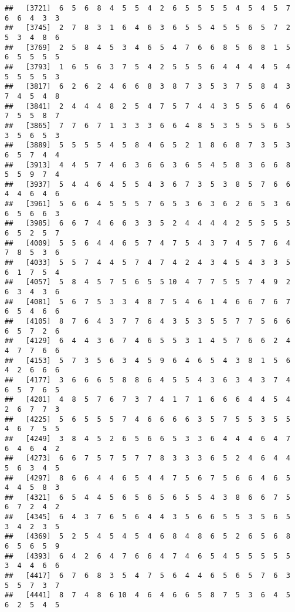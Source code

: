 \documentclass[
]{book}
\begin{document}
\begin{verbatim}
##   [3721]  6  5  6  8  4  5  5  4  2  6  5  5  5  5  4  5  4  5  7  6  6  4  3  3
##   [3745]  2  7  8  3  1  6  4  6  3  6  5  5  4  5  5  6  5  7  2  5  3  4  8  6
##   [3769]  2  5  8  4  5  3  4  6  5  4  7  6  6  8  5  6  8  1  5  6  5  5  5  5
##   [3793]  1  6  5  6  3  7  5  4  2  5  5  5  6  4  4  4  4  5  4  5  5  5  5  3
##   [3817]  6  2  6  2  4  6  6  8  3  8  7  3  5  3  7  5  8  4  3  7  4  5  4  8
##   [3841]  2  4  4  4  8  2  5  4  7  5  7  4  4  3  5  5  6  4  6  7  5  5  8  7
##   [3865]  7  7  6  7  1  3  3  3  6  6  4  8  5  3  5  5  5  6  5  3  5  6  5  3
##   [3889]  5  5  5  5  4  5  8  4  6  5  2  1  8  6  8  7  3  5  3  6  5  7  4  4
##   [3913]  4  4  5  7  4  6  3  6  6  3  6  5  4  5  8  3  6  6  8  5  5  9  7  4
##   [3937]  5  4  4  6  4  5  5  4  3  6  7  3  5  3  8  5  7  6  6  4  4  6  4  6
##   [3961]  5  6  6  4  5  5  5  7  6  5  3  6  3  6  2  6  5  3  6  6  5  6  6  3
##   [3985]  6  6  7  4  6  6  3  3  5  2  4  4  4  4  2  5  5  5  5  6  5  2  5  7
##   [4009]  5  5  6  4  4  6  5  7  4  7  5  4  3  7  4  5  7  6  4  7  8  5  3  6
##   [4033]  5  5  7  4  4  5  7  4  7  4  2  4  3  4  5  4  3  3  5  6  1  7  5  4
##   [4057]  5  8  4  5  7  5  6  5  5 10  4  7  7  5  5  7  4  9  2  6  3  4  3  6
##   [4081]  5  6  7  5  3  3  4  8  7  5  4  6  1  4  6  6  7  6  7  6  5  4  6  6
##   [4105]  8  7  6  4  3  7  7  6  4  3  5  3  5  5  7  7  5  6  6  6  5  7  2  6
##   [4129]  6  4  4  3  6  7  4  6  5  5  3  1  4  5  7  6  6  2  4  4  7  7  6  6
##   [4153]  5  7  3  5  6  3  4  5  9  6  4  6  5  4  3  8  1  5  6  4  2  6  6  6
##   [4177]  3  6  6  6  5  8  8  6  4  5  5  4  3  6  3  4  3  7  4  6  5  7  6  5
##   [4201]  4  8  5  7  6  7  3  7  4  1  7  1  6  6  6  4  4  5  4  2  6  7  7  3
##   [4225]  5  6  5  5  5  7  4  6  6  6  6  3  5  7  5  5  3  5  5  4  6  7  5  5
##   [4249]  3  8  4  5  2  6  5  6  6  5  3  3  6  4  4  4  6  4  7  6  4  6  4  2
##   [4273]  6  6  7  5  7  5  7  7  8  3  3  3  6  5  2  4  6  4  4  5  6  3  4  5
##   [4297]  8  6  6  4  4  6  5  4  4  7  5  6  7  5  6  6  4  6  5  4  4  5  8  3
##   [4321]  6  5  4  4  5  6  5  6  5  6  5  5  4  3  8  6  6  7  5  6  7  2  4  2
##   [4345]  6  4  3  7  6  5  6  4  4  3  5  6  6  5  5  3  5  6  5  3  4  2  3  5
##   [4369]  5  2  5  4  5  4  5  4  6  8  4  8  6  5  2  6  5  6  8  6  5  6  5  9
##   [4393]  6  4  2  6  4  7  6  6  4  7  4  6  5  4  5  5  5  5  5  3  4  4  6  6
##   [4417]  6  7  6  8  3  5  4  7  5  6  4  4  6  5  6  5  7  6  3  5  5  7  3  7
##   [4441]  8  7  4  8  6 10  4  6  4  6  6  5  8  7  5  3  6  4  5  6  2  5  4  5

\end{verbatim}
\end{document}
